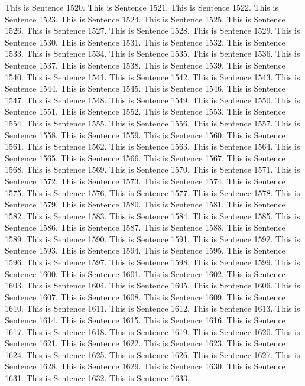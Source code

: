 \documentclass{article}
\begin{document}
This is Sentence 1520.
This is Sentence 1521.
This is Sentence 1522.
This is Sentence 1523.
This is Sentence 1524.
This is Sentence 1525.
This is Sentence 1526.
This is Sentence 1527.
This is Sentence 1528.
This is Sentence 1529.
This is Sentence 1530.
This is Sentence 1531.
This is Sentence 1532.
This is Sentence 1533.
This is Sentence 1534.
This is Sentence 1535.
This is Sentence 1536.
This is Sentence 1537.
This is Sentence 1538.
This is Sentence 1539.
This is Sentence 1540.
This is Sentence 1541.
This is Sentence 1542.
This is Sentence 1543.
This is Sentence 1544.
This is Sentence 1545.
This is Sentence 1546.
This is Sentence 1547.
This is Sentence 1548.
This is Sentence 1549.
This is Sentence 1550.
This is Sentence 1551.
This is Sentence 1552.
This is Sentence 1553.
This is Sentence 1554.
This is Sentence 1555.
This is Sentence 1556.
This is Sentence 1557.
This is Sentence 1558.
This is Sentence 1559.
This is Sentence 1560.
This is Sentence 1561.
This is Sentence 1562.
This is Sentence 1563.
This is Sentence 1564.
This is Sentence 1565.
This is Sentence 1566.
This is Sentence 1567.
This is Sentence 1568.
This is Sentence 1569.
This is Sentence 1570.
This is Sentence 1571.
This is Sentence 1572.
This is Sentence 1573.
This is Sentence 1574.
This is Sentence 1575.
This is Sentence 1576.
This is Sentence 1577.
This is Sentence 1578.
This is Sentence 1579.
This is Sentence 1580.
This is Sentence 1581.
This is Sentence 1582.
This is Sentence 1583.
This is Sentence 1584.
This is Sentence 1585.
This is Sentence 1586.
This is Sentence 1587.
This is Sentence 1588.
This is Sentence 1589.
This is Sentence 1590.
This is Sentence 1591.
This is Sentence 1592.
This is Sentence 1593.
This is Sentence 1594.
This is Sentence 1595.
This is Sentence 1596.
This is Sentence 1597.
This is Sentence 1598.
This is Sentence 1599.
This is Sentence 1600.
This is Sentence 1601.
This is Sentence 1602.
This is Sentence 1603.
This is Sentence 1604.
This is Sentence 1605.
This is Sentence 1606.
This is Sentence 1607.
This is Sentence 1608.
This is Sentence 1609.
This is Sentence 1610.
This is Sentence 1611.
This is Sentence 1612.
This is Sentence 1613.
This is Sentence 1614.
This is Sentence 1615.
This is Sentence 1616.
This is Sentence 1617.
This is Sentence 1618.
This is Sentence 1619.
This is Sentence 1620.
This is Sentence 1621.
This is Sentence 1622.
This is Sentence 1623.
This is Sentence 1624.
This is Sentence 1625.
This is Sentence 1626.
This is Sentence 1627.
This is Sentence 1628.
This is Sentence 1629.
This is Sentence 1630.
This is Sentence 1631.
This is Sentence 1632.
This is Sentence 1633.
\end{document}
